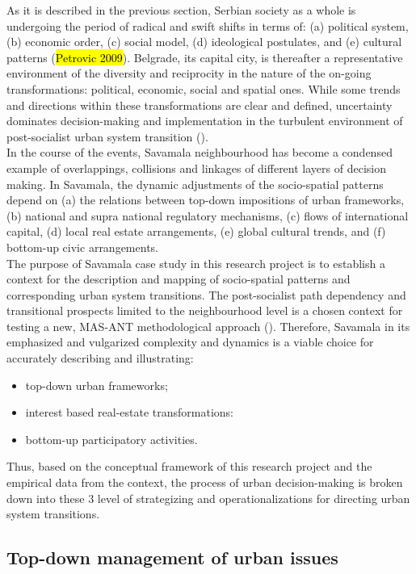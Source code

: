 \documentclass[11pt]{report}
\begin{document}
As it is described in the previous section, Serbian society as a whole is undergoing the period of radical and swift shifts in terms of: (a) political system,
(b) economic order,
(c) social model,
(d) ideological postulates, and
(e) cultural patterns (\hl{Petrovic 2009}).
Belgrade, its capital city, is thereafter a representative environment of the diversity and reciprocity in the nature of the on-going transformations: political, economic, social and spatial ones.
While some trends and directions within these transformations are clear and defined, uncertainty dominates decision-making and implementation in the turbulent environment of post-socialist urban system transition (\cite{(Nedovic-Budic, 2001)}).
\\
In the course of the events, Savamala neighbourhood has become a condensed example of overlappings, collisions and linkages of different layers of decision making.
In Savamala, the dynamic adjustments of the socio-spatial patterns depend on
(a) the relations between top-down impositions of urban frameworks, (b) national and supra national regulatory mechanisms,
(c) flows of international capital,
(d) local real estate arrangements,
(e) global cultural trends, and
(f) bottom-up civic arrangements.
\\
The purpose of Savamala case study in this research project is to establish a context for the description and mapping of socio-spatial patterns and corresponding urban system transitions.
The post-socialist path dependency and transitional prospects limited to the neighbourhood level is a chosen context for testing a new, MAS-ANT methodological approach (\cite{Yin, 2009}).
Therefore, Savamala in its emphasized and vulgarized complexity and dynamics is a viable choice for accurately describing and illustrating:
\begin{itemize}
\item top-down urban frameworks;
\item interest based real-estate transformations:
\item bottom-up participatory activities.
\end{itemize}

Thus, based on the conceptual framework of this research project and the empirical data from the context, the process of urban decision-making is broken down into these 3 level of strategizing and operationalizations for directing urban system transitions. 

\subsection{Top-down management of urban issues}
\end{document}
